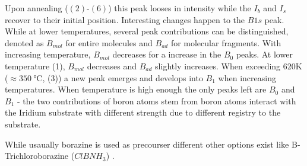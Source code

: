 Upon annealing ($(2)$-$(6)$) this peak looses in intensity while the $I_b$ and $I_s$ recover to their initial position. Interesting changes happen to the $B1s$ peak. While at lower temperatures, several peak contributions can be distinguished, denoted as $B_{mol}$ for entire molecules and $B_{ad}$ for molecular fragments. With increasing temperature, $B_{mol}$ decreases for a increase in the $B_0$ peaks. At lower temperature (1), $B_{mol}$ decreases and $B_{ad}$ slightly increases. When exceeding 620K ($\approx \SI{350}{\celsius}$, (3)) a new peak emerges and develops into $B_1$ when increasing temperatures. When temperature is high enough the only peaks left are $B_0$ and $B_1$ - the two contributions of boron atoms stem from boron atoms interact with the Iridium substrate with different strength due to different registry to the substrate.

While usaually borazine is used as precourser different other options exist like B-Trichloroborazine (${ClBNH}_3$) \cite{auwarter_synthesis_2004-1}.